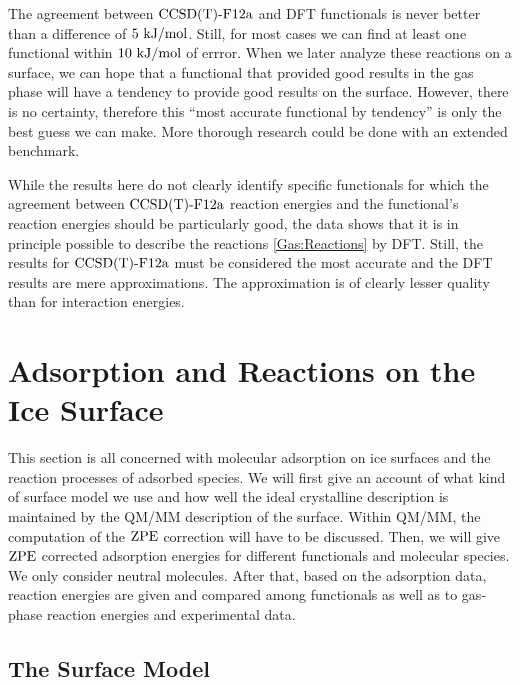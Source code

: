 The agreement between $\text{CCSD(T)-F12a}$ and DFT functionals is never better than a
difference of $5~\text {kJ/mol}$. Still, for most cases we can find at least one
functional within $10~\text {kJ/mol}$ of errror. When we later analyze these reactions on
a surface, we can hope that a functional that provided good results in the
gas phase will have a tendency to provide good results on the surface. However,
there is no certainty, therefore this ``most accurate functional by tendency'' is
only the best guess we can make. More thorough research could be done with
an extended benchmark.

While the results here do not clearly identify specific functionals for which
the agreement between \mbox{$\text{CCSD(T)-F12a}$} reaction energies and the functional's
reaction energies should be particularly good, the data shows that it
is in principle possible to describe the reactions \eqref{Gas:Reactions} by
DFT.
Still, the results for $\text{CCSD(T)-F12a}$ must be considered the most accurate
and the DFT results are mere approximations. The approximation is of
clearly lesser quality than for interaction energies.

\section{Adsorption and Reactions on the Ice Surface}
\label{Sec:Ads}

This section is all concerned with molecular adsorption on ice surfaces
and the reaction processes of adsorbed species. We will first give an
account of what kind of surface model we use and how well the ideal
crystalline description is maintained by the QM/MM description of
the surface. Within QM/MM, the computation of the $\text{ZPE}$ correction 
will have to be discussed. Then, we will give $\text{ZPE}$ corrected adsorption
energies for different functionals and molecular species. We only consider
neutral molecules.
After that, based on the adsorption data, reaction energies are given
and compared among functionals as well as to gas-phase reaction
energies and experimental data.

\subsection{The Surface Model}
\label{Sec:Ads:Model}

